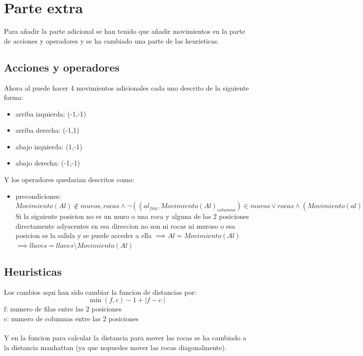 \documentclass[11pt,spanish]{article}
\begin{document}
	\section{Parte extra}
	Para añadir la parte adicional se han tenido que añadir movimientos en la parte de acciones y operadores y se ha cambiado una parte de las heuristicas.
		\subsection{Acciones y operadores}
			Ahora al puede hacer 4 movimientos adicionales cada uno descrito de la siguiente forma:
			\begin{itemize}
				\item arriba izquierda: (-1,-1)
				\item arriba derecha: (-1,1)
				\item abajo izquierda: (1,-1)
				\item abajo derecha: (-1,-1)
			\end{itemize}
			Y los operadores quedarian descritos como:
			\begin{itemize}
				\item precondiciones: $Movimiento(Al) \notin muros, rocas \land \neg((al_{fila},Movimiento(Al)_{columna}) \in muros \lor rocas  \land (Movimiento(al)_{fila},Al_{columna}) \in muros \lor rocas)\lor (llaves = \emptyset \land Movimiento(Al) = salida)$\\Si la siguiente posicion no es un muro o una roca y alguna de las 2 posiciones directamente adyacentes en esa direccion no son ni rocas ni muroso o  esa posicion es la salida y se puede acceder a ella
				$\implies Al = Movimiento(Al)$\\
				$\implies llaves = llaves\setminus Movimiento(Al)$
			\end{itemize}
		\subsection{Heuristicas}
			Los cambios aqui han sido cambiar la funcion de distancias por:\\
			$$\min(f,c)-1 + \mid f-c\mid$$
			f: numero de filas entre las 2 posiciones\\
			c: numero de columnas entre las 2 posiciones\\
			\\
			Y en la funcion para calcular la distancia para mover las rocas se ha cambiado a la distancia manhattan (ya que nopuedes mover las rocas diagonalmente).\\
\end{document}
